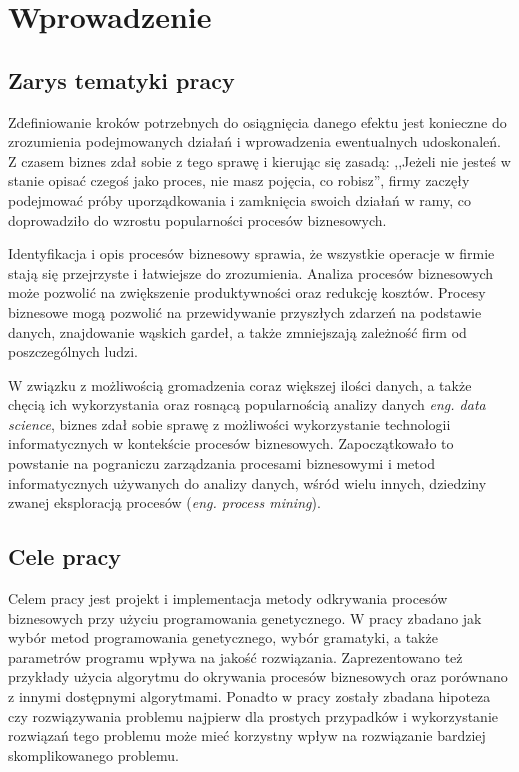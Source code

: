 \chapter{Wprowadzenie}
\label{cha:wprowadzenie}


\section{Zarys tematyki pracy}
\label{sec:zarysPracy}

Zdefiniowanie kroków potrzebnych do osiągnięcia danego efektu jest konieczne do zrozumienia podejmowanych działań i wprowadzenia ewentualnych udoskonaleń. Z czasem biznes zdał sobie z tego sprawę i kierując się zasadą: ,,Jeżeli nie jesteś w stanie opisać czegoś jako proces, nie masz pojęcia, co robisz'', firmy zaczęły podejmować próby uporządkowania i zamknięcia swoich działań w ramy, co doprowadziło do wzrostu popularności procesów biznesowych.

Identyfikacja i opis procesów biznesowy sprawia, że wszystkie operacje w firmie stają się przejrzyste i łatwiejsze do zrozumienia. Analiza procesów biznesowych może pozwolić na zwiększenie produktywności oraz redukcję kosztów. Procesy biznesowe mogą pozwolić na przewidywanie przyszłych zdarzeń na podstawie danych, znajdowanie wąskich gardeł, a także zmniejszają zależność firm od poszczególnych ludzi.

W związku z możliwością gromadzenia coraz większej ilości danych, a także chęcią ich wykorzystania oraz rosnącą popularnością analizy danych \textit{eng. data science}, biznes zdał sobie sprawę z możliwości wykorzystanie technologii informatycznych w kontekście procesów biznesowych. Zapoczątkowało to powstanie na pograniczu zarządzania procesami biznesowymi i metod informatycznych używanych do analizy danych, wśród wielu innych, dziedziny zwanej eksploracją procesów (\textit{eng. process mining}).
 
\section{Cele pracy}
\label{sec:celePracy}

Celem pracy jest projekt i implementacja metody odkrywania procesów biznesowych przy użyciu programowania genetycznego. W pracy zbadano jak wybór metod programowania genetycznego, wybór gramatyki, a także parametrów programu wpływa na jakość rozwiązania. Zaprezentowano też przykłady użycia algorytmu do okrywania procesów biznesowych oraz porównano z innymi dostępnymi algorytmami. Ponadto w pracy zostały zbadana hipoteza czy rozwiązywania problemu najpierw dla prostych przypadków i wykorzystanie rozwiązań tego problemu może mieć korzystny wpływ na rozwiązanie bardziej skomplikowanego problemu.

